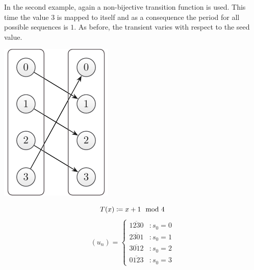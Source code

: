 \documentclass{stdlocal}
\begin{document}
    \noindent
    In the second example, again a non-bijective transition function is used.
    This time the value $3$ is mapped to itself and as a consequence the period for all possible sequences is $1$.
    As before, the transient varies with respect to the seed value.

    \medskip
    \begin{minipage}{0.25\textwidth}
      \includegraphics[width=\textwidth]{figures/periodicity_example_c.pdf}
    \end{minipage}
    \hfill
    \begin{minipage}{0.73\textwidth}
      \[
        T(x) \coloneqq x + 1 \mod 4
      \]
      \[
        (u_n) =
        \begin{cases}
          \overline{1230} &: s_0 = 0 \\
          \overline{2301} &: s_0 = 1 \\
          \overline{3012} &: s_0 = 2 \\
          \overline{0123} &: s_0 = 3
        \end{cases}
      \]
    \end{minipage}
    \smallskip
\end{document}
